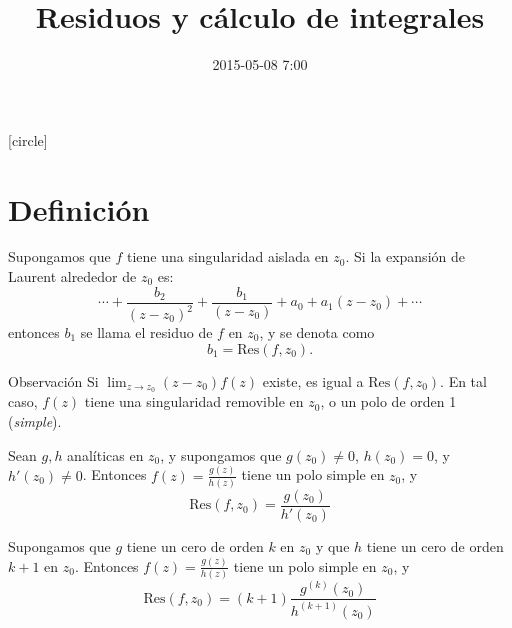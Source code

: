 \documentclass[spanish,presentation]{beamer}
\date{2015-05-08 7:00}
\title{Residuos y cálculo de integrales}
\begin{document}
\maketitle
{}
[circle]

\tableofcontents

\section{Definición}
\label{orgheadline1}

\begin{frame}[label=sec-1-1]{}
\begin{definition}[Residuo]
Supongamos que \(f\) tiene una singularidad aislada en
\(z_{0}\). Si la expansión de Laurent alrededor de \(z_{0}\) es:
\begin{displaymath}
\cdots+\frac{b_{2}}{(z-z_{0})^{2}}+\frac{b_{1}}{(z-z_{0})}+a_{0}+a_{1}(z-z_{0})+\cdots
\end{displaymath}
entonces \(b_{1}\) se llama el \alert{residuo} de \(f\) en \(z_{0}\), y
se denota como
\begin{displaymath}
b_{1}=\mathrm{Res}(f,z_{0}).
\end{displaymath}
\end{definition}

\begin{block}{Observación}
Si \(\lim_{z\to z_{0}}(z-z_{0})f(z)\) existe, es igual a
\(\mathrm{Res}(f,z_{0})\). En tal caso, \(f(z)\) tiene una
singularidad removible en \(z_{0}\), o un polo de orden 1
(\emph{simple}). 
\end{block}
\end{frame}

\begin{frame}[label=sec-1-2]{}
\begin{theorem}
Sean \(g,h\) analíticas en \(z_{0}\), y supongamos que
\(g(z_{0})\ne 0\), \(h(z_{0})=0\), y \(h'(z_{0})\ne 0\). Entonces
\(f(z)=\frac{g(z)}{h(z)}\) tiene un polo simple en \(z_{0}\), y
\begin{displaymath}
\mathrm{Res}(f,z_{0})=\frac{g(z_{0})}{h'(z_{0})}
\end{displaymath}
\end{theorem}

\begin{theorem}[Generalización]
Supongamos que \(g\) tiene un cero de orden \(k\) en \(z_{0}\) y
que \(h\) tiene un cero de orden \(k+1\) en \(z_{0}\). Entonces
\(f(z)=\frac{g(z)}{h(z)}\) tiene un polo simple en \(z_{0}\), y
\begin{displaymath}
\mathrm{Res}(f,z_{0})=(k+1)\frac{g^{(k)}(z_{0})}{h^{(k+1)}(z_{0})}
\end{displaymath}
\end{theorem}
\end{frame}
\end{document}
